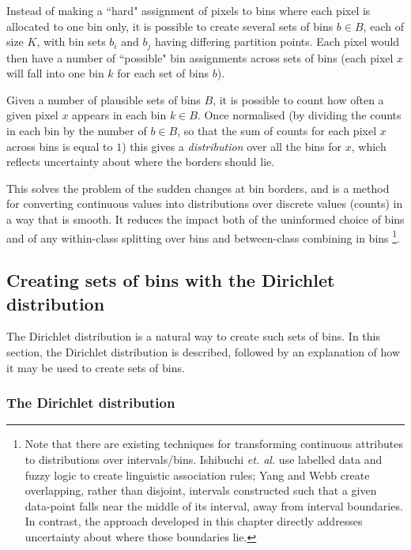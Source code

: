 Instead of making a ``hard" assignment of pixels to bins where each pixel is allocated to one bin only, it is possible to create several sets of bins $b \in B$, each of size $K$, with bin sets $b_i$ and $b_j$ having differing partition points. Each pixel would then have a number of ``possible" bin assignments across sets of bins (each pixel $x$ will fall into one bin $k$ for each set of bins $b$).

Given a number of plausible sets of bins $B$, it is possible to count how often a given pixel $x$ appears in each bin $k \in B$. Once normalised (by dividing the counts in each bin by the number of $b \in B$, so that the sum of counts for each pixel $x$ across bins is equal to $1$) this gives a {\it distribution} over all the bins for $x$, which reflects uncertainty about where the borders should lie. 

This solves the problem of the sudden changes at bin borders, and is a method for converting continuous values into distributions over discrete values (counts) in a way that is smooth. It reduces the impact both of the uninformed choice of bins and of any within-class splitting over bins and between-class combining in bins \cite{clarke2000entropy}\footnote{Note that there are existing techniques for transforming continuous attributes to distributions over intervals/bins. Ishibuchi \textit{et. al.} \cite{ishibuchi2004fuzzy} use labelled data and fuzzy logic to create linguistic association rules; Yang and Webb \cite{yang2002non} create overlapping, rather than disjoint, intervals constructed such that a given data-point falls near the middle of its interval, away from interval boundaries. In contrast, the approach developed in this chapter directly addresses uncertainty about where those boundaries lie.}.

\subsection{Creating sets of bins with the Dirichlet distribution}

The Dirichlet distribution is a natural way to create such sets of bins. In this section, the Dirichlet distribution is described, followed by an explanation of how it may be used to create sets of bins.

\subsubsection{The Dirichlet distribution}


